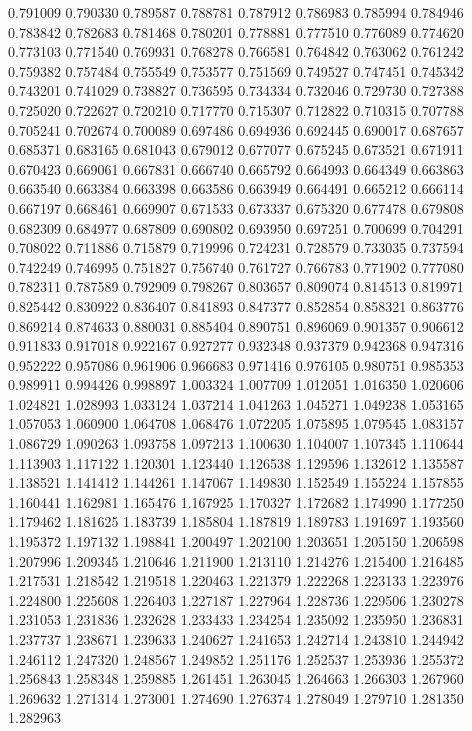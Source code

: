 0.791009
0.790330
0.789587
0.788781
0.787912
0.786983
0.785994
0.784946
0.783842
0.782683
0.781468
0.780201
0.778881
0.777510
0.776089
0.774620
0.773103
0.771540
0.769931
0.768278
0.766581
0.764842
0.763062
0.761242
0.759382
0.757484
0.755549
0.753577
0.751569
0.749527
0.747451
0.745342
0.743201
0.741029
0.738827
0.736595
0.734334
0.732046
0.729730
0.727388
0.725020
0.722627
0.720210
0.717770
0.715307
0.712822
0.710315
0.707788
0.705241
0.702674
0.700089
0.697486
0.694936
0.692445
0.690017
0.687657
0.685371
0.683165
0.681043
0.679012
0.677077
0.675245
0.673521
0.671911
0.670423
0.669061
0.667831
0.666740
0.665792
0.664993
0.664349
0.663863
0.663540
0.663384
0.663398
0.663586
0.663949
0.664491
0.665212
0.666114
0.667197
0.668461
0.669907
0.671533
0.673337
0.675320
0.677478
0.679808
0.682309
0.684977
0.687809
0.690802
0.693950
0.697251
0.700699
0.704291
0.708022
0.711886
0.715879
0.719996
0.724231
0.728579
0.733035
0.737594
0.742249
0.746995
0.751827
0.756740
0.761727
0.766783
0.771902
0.777080
0.782311
0.787589
0.792909
0.798267
0.803657
0.809074
0.814513
0.819971
0.825442
0.830922
0.836407
0.841893
0.847377
0.852854
0.858321
0.863776
0.869214
0.874633
0.880031
0.885404
0.890751
0.896069
0.901357
0.906612
0.911833
0.917018
0.922167
0.927277
0.932348
0.937379
0.942368
0.947316
0.952222
0.957086
0.961906
0.966683
0.971416
0.976105
0.980751
0.985353
0.989911
0.994426
0.998897
1.003324
1.007709
1.012051
1.016350
1.020606
1.024821
1.028993
1.033124
1.037214
1.041263
1.045271
1.049238
1.053165
1.057053
1.060900
1.064708
1.068476
1.072205
1.075895
1.079545
1.083157
1.086729
1.090263
1.093758
1.097213
1.100630
1.104007
1.107345
1.110644
1.113903
1.117122
1.120301
1.123440
1.126538
1.129596
1.132612
1.135587
1.138521
1.141412
1.144261
1.147067
1.149830
1.152549
1.155224
1.157855
1.160441
1.162981
1.165476
1.167925
1.170327
1.172682
1.174990
1.177250
1.179462
1.181625
1.183739
1.185804
1.187819
1.189783
1.191697
1.193560
1.195372
1.197132
1.198841
1.200497
1.202100
1.203651
1.205150
1.206598
1.207996
1.209345
1.210646
1.211900
1.213110
1.214276
1.215400
1.216485
1.217531
1.218542
1.219518
1.220463
1.221379
1.222268
1.223133
1.223976
1.224800
1.225608
1.226403
1.227187
1.227964
1.228736
1.229506
1.230278
1.231053
1.231836
1.232628
1.233433
1.234254
1.235092
1.235950
1.236831
1.237737
1.238671
1.239633
1.240627
1.241653
1.242714
1.243810
1.244942
1.246112
1.247320
1.248567
1.249852
1.251176
1.252537
1.253936
1.255372
1.256843
1.258348
1.259885
1.261451
1.263045
1.264663
1.266303
1.267960
1.269632
1.271314
1.273001
1.274690
1.276374
1.278049
1.279710
1.281350
1.282963
